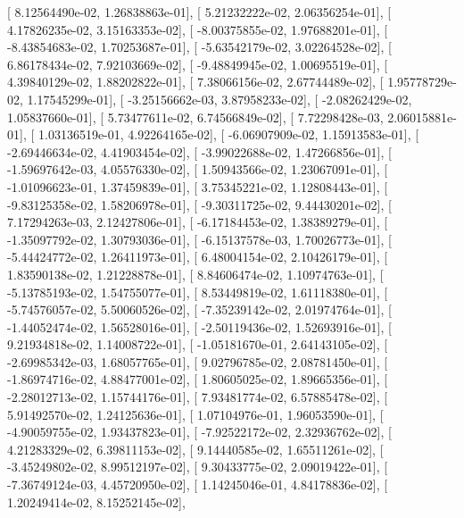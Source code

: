 \documentclass{article}
\begin{document}
       [  8.12564490e-02,   1.26838863e-01],
       [  5.21232222e-02,   2.06356254e-01],
       [  4.17826235e-02,   3.15163353e-02],
       [ -8.00375855e-02,   1.97688201e-01],
       [ -8.43854683e-02,   1.70253687e-01],
       [ -5.63542179e-02,   3.02264528e-02],
       [  6.86178434e-02,   7.92103669e-02],
       [ -9.48849945e-02,   1.00695519e-01],
       [  4.39840129e-02,   1.88202822e-01],
       [  7.38066156e-02,   2.67744489e-02],
       [  1.95778729e-02,   1.17545299e-01],
       [ -3.25156662e-03,   3.87958233e-02],
       [ -2.08262429e-02,   1.05837660e-01],
       [  5.73477611e-02,   6.74566849e-02],
       [  7.72298428e-03,   2.06015881e-01],
       [  1.03136519e-01,   4.92264165e-02],
       [ -6.06907909e-02,   1.15913583e-01],
       [ -2.69446634e-02,   4.41903454e-02],
       [ -3.99022688e-02,   1.47266856e-01],
       [ -1.59697642e-03,   4.05576330e-02],
       [  1.50943566e-02,   1.23067091e-01],
       [ -1.01096623e-01,   1.37459839e-01],
       [  3.75345221e-02,   1.12808443e-01],
       [ -9.83125358e-02,   1.58206978e-01],
       [ -9.30311725e-02,   9.44430201e-02],
       [  7.17294263e-03,   2.12427806e-01],
       [ -6.17184453e-02,   1.38389279e-01],
       [ -1.35097792e-02,   1.30793036e-01],
       [ -6.15137578e-03,   1.70026773e-01],
       [ -5.44424772e-02,   1.26411973e-01],
       [  6.48004154e-02,   2.10426179e-01],
       [  1.83590138e-02,   1.21228878e-01],
       [  8.84606474e-02,   1.10974763e-01],
       [ -5.13785193e-02,   1.54755077e-01],
       [  8.53449819e-02,   1.61118380e-01],
       [ -5.74576057e-02,   5.50060526e-02],
       [ -7.35239142e-02,   2.01974764e-01],
       [ -1.44052474e-02,   1.56528016e-01],
       [ -2.50119436e-02,   1.52693916e-01],
       [  9.21934818e-02,   1.14008722e-01],
       [ -1.05181670e-01,   2.64143105e-02],
       [ -2.69985342e-03,   1.68057765e-01],
       [  9.02796785e-02,   2.08781450e-01],
       [ -1.86974716e-02,   4.88477001e-02],
       [  1.80605025e-02,   1.89665356e-01],
       [ -2.28012713e-02,   1.15744176e-01],
       [  7.93481774e-02,   6.57885478e-02],
       [  5.91492570e-02,   1.24125636e-01],
       [  1.07104976e-01,   1.96053590e-01],
       [ -4.90059755e-02,   1.93437823e-01],
       [ -7.92522172e-02,   2.32936762e-02],
       [  4.21283329e-02,   6.39811153e-02],
       [  9.14440585e-02,   1.65511261e-02],
       [ -3.45249802e-02,   8.99512197e-02],
       [  9.30433775e-02,   2.09019422e-01],
       [ -7.36749124e-03,   4.45720950e-02],
       [  1.14245046e-01,   4.84178836e-02],
       [  1.20249414e-02,   8.15252145e-02],
\end{document}
